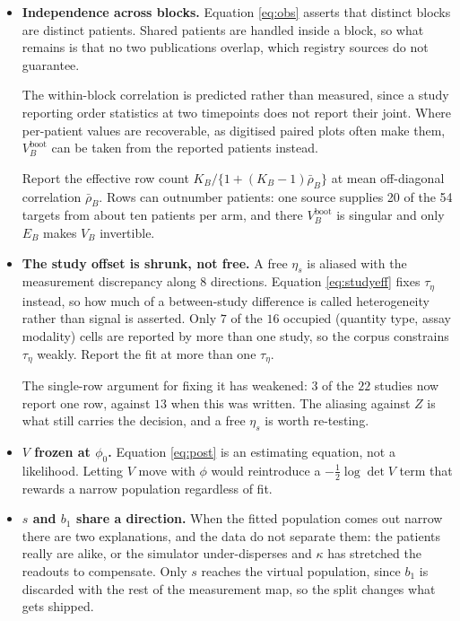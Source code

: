 \documentclass[11pt]{article}
\begin{document}
\begin{itemize}
\item \textbf{Independence across blocks.} Equation \eqref{eq:obs} asserts that
distinct blocks are distinct patients. Shared patients are handled inside a
block, so what remains is that no two publications overlap, which registry
sources do not guarantee.

The within-block correlation is predicted rather than measured, since a study
reporting order statistics at two timepoints does not report their joint. Where
per-patient values are recoverable, as digitised paired plots often make them,
$V^{\text{boot}}_B$ can be taken from the reported patients instead.

Report the effective row count $K_B/\{1+(K_B-1)\bar\rho_B\}$ at mean off-diagonal
correlation $\bar\rho_B$. Rows can outnumber patients: one source supplies 20 of
the 54 targets from about ten patients per arm, and there
$V^{\text{boot}}_B$ is singular and only $E_B$ makes $V_B$ invertible.

\item \textbf{The study offset is shrunk, not free.} A free $\eta_s$ is aliased
with the measurement discrepancy along $8$ directions. Equation
\eqref{eq:studyeff} fixes $\tau_\eta$ instead, so how much of a between-study
difference is called heterogeneity rather than signal is asserted. Only $7$ of
the $16$ occupied (quantity type, assay modality) cells are reported by more than
one study, so the corpus constrains $\tau_\eta$ weakly. Report the fit at more
than one $\tau_\eta$.

The single-row argument for fixing it has weakened: $3$ of the $22$ studies now
report one row, against $13$ when this was written. The aliasing against $Z$ is
what still carries the decision, and a free $\eta_s$ is worth re-testing.

\item \textbf{$V$ frozen at $\phi_0$.} Equation \eqref{eq:post} is an estimating
equation, not a likelihood. Letting $V$ move with $\phi$ would reintroduce a
$-\tfrac12\log\det V$ term that rewards a narrow population regardless of fit.

\item \textbf{$s$ and $b_1$ share a direction.} When the fitted population comes
out narrow there are two explanations, and the data do not separate them: the
patients really are alike, or the simulator under-disperses and $\kappa$ has
stretched the readouts to compensate. Only $s$ reaches the virtual population,
since $b_1$ is discarded with the rest of the measurement map, so the split
changes what gets shipped.


\end{itemize}
\end{document}
